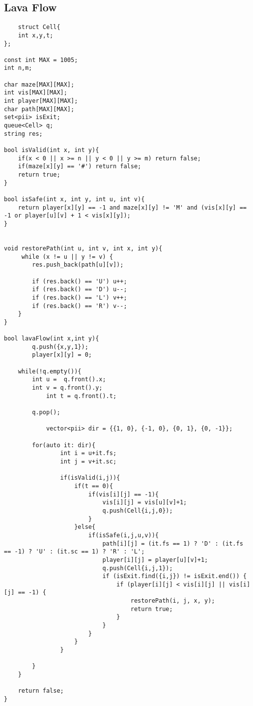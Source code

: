 \documentclass{article}
\begin{document}
\subsection{Lava Flow}
\begin{lstlisting}
    struct Cell{
    int x,y,t;
};
 
const int MAX = 1005;
int n,m;
 
char maze[MAX][MAX];
int vis[MAX][MAX];
int player[MAX][MAX];
char path[MAX][MAX];
set<pii> isExit;
queue<Cell> q;
string res;
 
bool isValid(int x, int y){
    if(x < 0 || x >= n || y < 0 || y >= m) return false;
    if(maze[x][y] == '#') return false;
    return true;
}

bool isSafe(int x, int y, int u, int v){
    return player[x][y] == -1 and maze[x][y] != 'M' and (vis[x][y] == -1 or player[u][v] + 1 < vis[x][y]);
}


void restorePath(int u, int v, int x, int y){
	 while (x != u || y != v) {
        res.push_back(path[u][v]);

        if (res.back() == 'U') u++;
        if (res.back() == 'D') u--;
        if (res.back() == 'L') v++;
        if (res.back() == 'R') v--;
    }
}
 
bool lavaFlow(int x,int y){
        q.push({x,y,1});
        player[x][y] = 0;

	while(!q.empty()){
		int u =  q.front().x;
		int v = q.front().y;
            int t = q.front().t;

		q.pop();

            vector<pii> dir = {{1, 0}, {-1, 0}, {0, 1}, {0, -1}};
     
    	for(auto it: dir){
                int i = u+it.fs;
                int j = v+it.sc;
    
                if(isValid(i,j)){
                    if(t == 0){
                        if(vis[i][j] == -1){
                            vis[i][j] = vis[u][v]+1;
                            q.push(Cell{i,j,0});
                        }
                    }else{
                        if(isSafe(i,j,u,v)){
                            path[i][j] = (it.fs == 1) ? 'D' : (it.fs == -1) ? 'U' : (it.sc == 1) ? 'R' : 'L';
                            player[i][j] = player[u][v]+1;
                            q.push(Cell{i,j,1});
                            if (isExit.find({i,j}) != isExit.end()) {
                                if (player[i][j] < vis[i][j] || vis[i][j] == -1) {
                                    restorePath(i, j, x, y);
                                    return true;
                                }
                            }
                        }
                    }
                }
    
        }
    }
 
    return false;
}
\end{lstlisting}
\end{document}
